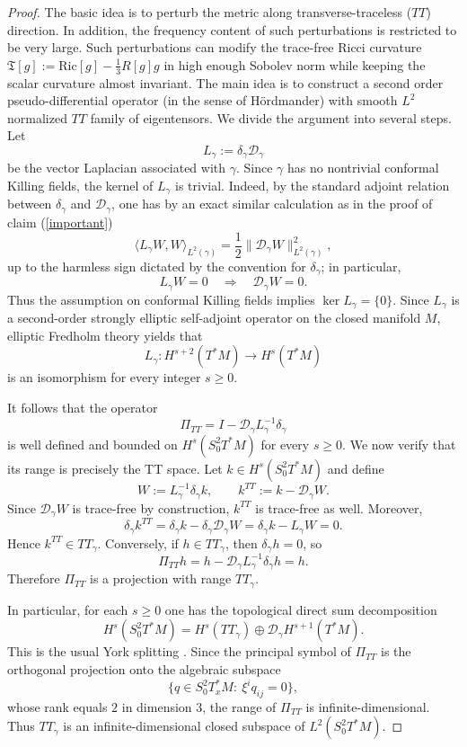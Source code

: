 \documentclass{amsart}
\begin{document}
\begin{proof} The basic idea is to perturb the metric along transverse-traceless ($TT$) direction. In addition, the frequency content of such perturbations is restricted to be very large. Such perturbations can modify the trace-free Ricci curvature $\mathfrak{T}[g]:=\text{Ric}[g]-\frac{1}{3}R[g]g$ in high enough Sobolev norm while keeping the scalar curvature almost invariant. 
The main idea is to construct a second order pseudo-differential operator (in the sense of H\"ordmander) with smooth $L^{2}$ normalized $TT$ family of eigentensors.  We divide the argument into several steps. 
Let
\[
L_\gamma:=\delta_\gamma\mathcal D_\gamma
\]
be the vector Laplacian associated with $\gamma$. Since $\gamma$ has no nontrivial conformal Killing fields, the kernel of $L_\gamma$ is trivial. Indeed, by the standard adjoint relation between $\delta_\gamma$ and $\mathcal D_\gamma$, one has by an exact similar calculation as in the proof of claim (\ref{important})
\[
\langle L_\gamma W,W\rangle_{L^2(\gamma)}
=
\frac12\|\mathcal D_\gamma W\|_{L^2(\gamma)}^{2},
\]
up to the harmless sign dictated by the convention for $\delta_\gamma$; in particular,
\[
L_\gamma W=0
\quad\Longrightarrow\quad
\mathcal D_\gamma W=0.
\]
Thus the assumption on conformal Killing fields implies $\ker L_\gamma=\{0\}$. Since $L_\gamma$ is a second-order strongly elliptic self-adjoint operator on the closed manifold $M$, elliptic Fredholm theory yields that
\[
L_\gamma:H^{s+2}(T^*M)\to H^s(T^*M)
\]
is an isomorphism for every integer $s\ge0$.

\noindent It follows that the operator
\[
\Pi_{TT}
=
I-\mathcal D_\gamma L_\gamma^{-1}\delta_\gamma
\]
is well defined and bounded on $H^s(S^2_0T^*M)$ for every $s\ge0$. We now verify that its range is precisely the TT space. Let $k\in H^s(S^2_0T^*M)$ and define
\[
W:=L_\gamma^{-1}\delta_\gamma k,\qquad k^{TT}:=k-\mathcal D_\gamma W.
\]
Since $\mathcal D_\gamma W$ is trace-free by construction, $k^{TT}$ is trace-free as well. Moreover,
\[
\delta_\gamma k^{TT}
=
\delta_\gamma k-\delta_\gamma\mathcal D_\gamma W
=
\delta_\gamma k-L_\gamma W
=
0.
\]
Hence $k^{TT}\in TT_\gamma$. Conversely, if $h\in TT_\gamma$, then $\delta_\gamma h=0$, so
\[
\Pi_{TT}h
=
h-\mathcal D_\gamma L_\gamma^{-1}\delta_\gamma h
=
h.
\]
Therefore $\Pi_{TT}$ is a projection with range $TT_\gamma$.

\noindent In particular, for each $s\ge0$ one has the topological direct sum decomposition
\[
H^s(S^2_0T^*M)
=
H^s(TT_\gamma)\oplus \mathcal D_\gamma H^{s+1}(T^*M).
\]
This is the usual York splitting \cite{york}. Since the principal symbol of $\Pi_{TT}$ is the orthogonal projection onto the algebraic subspace
\[
\{q\in S^2_0T_x^*M:\ \xi^i q_{ij}=0\},
\]
whose rank equals $2$ in dimension $3$, the range of $\Pi_{TT}$ is infinite-dimensional. Thus $TT_\gamma$ is an infinite-dimensional closed subspace of $L^2(S^2_0T^*M)$.


\end{proof}
\end{document}

